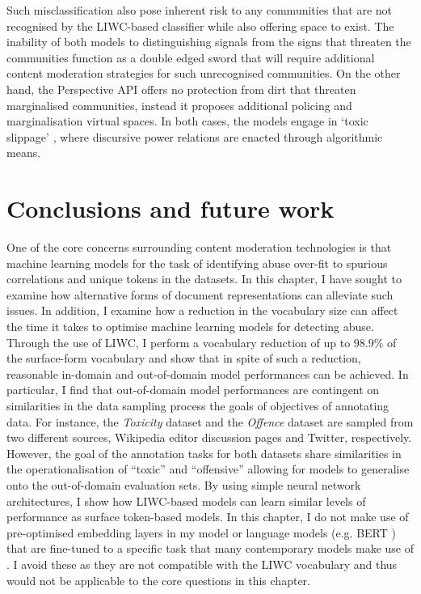 Such misclassification also pose inherent risk to any communities that are not recognised by the LIWC-based classifier while also offering space  to exist.
The inability of both models to distinguishing signals from the signs that threaten the communities function as a double edged sword that will require additional content moderation strategies for such unrecognised communities.
On the other hand, the Perspective API offers no protection from dirt that threaten marginalised communities, instead it proposes additional policing and marginalisation virtual spaces.
In both cases, the models engage in `toxic slippage' \citep{Risam:2015}, where discursive power relations are enacted through algorithmic means.

\section{Conclusions and future work}
One of the core concerns surrounding content moderation technologies is that machine learning models for the task of identifying abuse over-fit to spurious correlations and unique tokens in the datasets.
In this chapter, I have sought to examine how alternative forms of document representations can alleviate such issues.
In addition, I examine how a reduction in the vocabulary size can affect the time it takes to optimise machine learning models for detecting abuse.
Through the use of LIWC, I perform a vocabulary reduction of up to $98.9\%$ of the surface-form vocabulary and show that in spite of such a reduction, reasonable in-domain and out-of-domain model performances can be achieved.
In particular, I find that out-of-domain model performances are contingent on similarities in the data sampling process  the goals of objectives of annotating data.
For instance, the \textit{Toxicity} dataset and the \textit{Offence} dataset are sampled from two different sources, Wikipedia editor discussion pages and Twitter, respectively.
However, the goal of the annotation tasks for both datasets share similarities in the operationalisation of ``toxic'' and ``offensive'' allowing for models to generalise onto the out-of-domain evaluation sets.
By using simple neural network architectures, I show how LIWC-based models can learn similar levels of performance as surface token-based models.
In this chapter, I do not make use of pre-optimised embedding layers \citep{Park:2017,Kolhatkar:2020} in my model or language models (e.g. BERT \citep{Devlin:2019}) that are fine-tuned to a specific task that many contemporary models make use of \citet[e.g.]{Vidgen_learning:2020,Isaksen:2020}.
I avoid these as they are not compatible with the LIWC vocabulary and thus would not be applicable to the core questions in this chapter.


